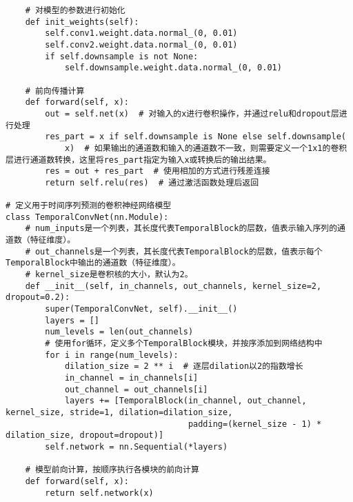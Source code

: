 \begin{lstlisting}
    # 对模型的参数进行初始化
    def init_weights(self):
        self.conv1.weight.data.normal_(0, 0.01)
        self.conv2.weight.data.normal_(0, 0.01)
        if self.downsample is not None:
            self.downsample.weight.data.normal_(0, 0.01)

    # 前向传播计算
    def forward(self, x):
        out = self.net(x)  # 对输入的x进行卷积操作，并通过relu和dropout层进行处理
        res_part = x if self.downsample is None else self.downsample(
            x)  # 如果输出的通道数和输入的通道数不一致，则需要定义一个1x1的卷积层进行通道数转换，这里将res_part指定为输入x或转换后的输出结果。
        res = out + res_part  # 使用相加的方式进行残差连接
        return self.relu(res)  # 通过激活函数处理后返回

# 定义用于时间序列预测的卷积神经网络模型
class TemporalConvNet(nn.Module):
    # num_inputs是一个列表，其长度代表TemporalBlock的层数，值表示输入序列的通道数（特征维度）。
    # out_channels是一个列表，其长度代表TemporalBlock的层数，值表示每个TemporalBlock中输出的通道数（特征维度）。
    # kernel_size是卷积核的大小，默认为2。
    def __init__(self, in_channels, out_channels, kernel_size=2, dropout=0.2):
        super(TemporalConvNet, self).__init__()
        layers = []
        num_levels = len(out_channels)
        # 使用for循环，定义多个TemporalBlock模块，并按序添加到网络结构中
        for i in range(num_levels):
            dilation_size = 2 ** i  # 逐层dilation以2的指数增长
            in_channel = in_channels[i]
            out_channel = out_channels[i]
            layers += [TemporalBlock(in_channel, out_channel, kernel_size, stride=1, dilation=dilation_size,
                                     padding=(kernel_size - 1) * dilation_size, dropout=dropout)]
        self.network = nn.Sequential(*layers)

    # 模型前向计算，按顺序执行各模块的前向计算
    def forward(self, x):
        return self.network(x)
\end{lstlisting}

